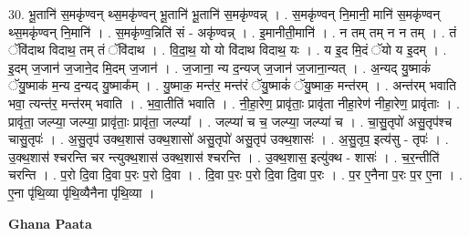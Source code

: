 \documentclass[17pt]{extarticle}
\begin{document}
30. भू॒तानि॑ स॒मकृ॑ण्वन् थ्स॒मकृ॑ण्वन् भू॒तानि॑ भू॒तानि॑ स॒मकृ॑ण्वन्न् । . स॒मकृ॑ण्वन् नि॒मानी॒ मानि॑ स॒मकृ॑ण्वन् थ्स॒मकृ॑ण्वन् नि॒मानि॑ । . स॒मकृ॑ण्व॒न्निति॑ सं - अकृ॑ण्वन्न् । . इ॒मानीती॒मानि॑ । . न तम् तम् न न तम् । . तं ॅवि॑दाथ विदाथ॒ तम् तं ॅवि॑दाथ । . वि॒दा॒थ॒ यो यो वि॑दाथ विदाथ॒ यः । . य इ॒द मि॒दं ॅयो य इ॒दम् । . इ॒दम् ज॒जान॑ ज॒जाने॒द मि॒दम् ज॒जान॑ । . ज॒जाना॒ न्य द॒न्यज् ज॒जान॑ ज॒जाना॒न्यत् । . अ॒न्यद् यु॒ष्माकं॑ ॅयु॒ष्माक॑ म॒न्य द॒न्यद् यु॒ष्माक᳚म् । . यु॒ष्माक॒ मन्त॑र॒ मन्त॑रं ॅयु॒ष्माकं॑ ॅयु॒ष्माक॒ मन्त॑रम् । . अन्त॑रम् भवाति भवा॒ त्यन्त॑र॒ मन्त॑रम् भवाति । . भ॒वा॒तीति॑ भवाति । . नी॒हा॒रेण॒ प्रावृ॑ताः॒ प्रावृ॑ता नीहा॒रेण॑ नीहा॒रेण॒ प्रावृ॑ताः । . प्रावृ॑ता॒ जल्प्या॒ जल्प्या॒ प्रावृ॑ताः॒ प्रावृ॑ता॒ जल्प्या᳚ । . जल्प्या॑ च च॒ जल्प्या॒ जल्प्या॑ च । . चा॒सु॒तृपो॑ असु॒तृप॑श्च चासु॒तृपः॑ । . अ॒सु॒तृप॑ उक्थ॒शास॑ उक्थ॒शासो॑ असु॒तृपो॑ असु॒तृप॑ उक्थ॒शासः॑ । . अ॒सु॒तृप॒ इत्य॑सु - तृपः॑ । . उ॒क्थ॒शास॑ श्चरन्ति चर न्त्युक्थ॒शास॑ उक्थ॒शास॑ श्चरन्ति । . उ॒क्थ॒शास॒ इत्यु॑क्थ - शासः॑ । . च॒र॒न्तीति॑ चरन्ति । . प॒रो दि॒वा दि॒वा प॒रः प॒रो दि॒वा । . दि॒वा प॒रः प॒रो दि॒वा दि॒वा प॒रः । . प॒र ए॒नैना प॒रः प॒र ए॒ना । . ए॒ना पृ॑थि॒व्या पृ॑थि॒व्यैनैना पृ॑थि॒व्या । \newline

\textbf{Ghana Paata } \newline
\end{document}
